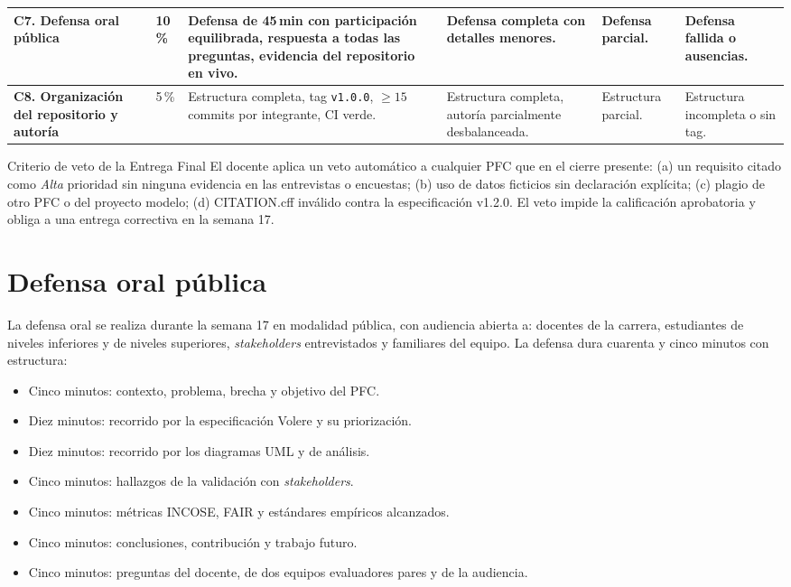 \documentclass[11pt,a4paper]{article}
\begin{document}
\begin{longtable}{|L{4.2cm}|C{0.9cm}|L{3.3cm}|L{2.4cm}|L{2.4cm}|L{1.6cm}|}
\textbf{C7. Defensa oral p\'ublica} & 10\,\% & Defensa de 45\,min con participaci\'on equilibrada, respuesta a todas las preguntas, evidencia del repositorio en vivo. & Defensa completa con detalles menores. & Defensa parcial. & Defensa fallida o ausencias.\\ \hline
\textbf{C8. Organizaci\'on del repositorio y autor\'ia} & 5\,\% & Estructura completa, tag \texttt{v1.0.0}, $\geq 15$ commits por integrante, CI verde. & Estructura completa, autor\'ia parcialmente desbalanceada. & Estructura parcial. & Estructura incompleta o sin tag.\\ \hline
\end{longtable}

\begin{cajacritica}{Criterio de veto de la Entrega Final}
El docente aplica un veto autom\'atico a cualquier PFC que en el cierre presente: (a) un requisito citado como \emph{Alta} prioridad sin ninguna evidencia en las entrevistas o encuestas; (b) uso de datos ficticios sin declaraci\'on expl\'icita; (c) plagio de otro PFC o del proyecto modelo; (d) CITATION.cff inv\'alido contra la especificaci\'on v1.2.0. El veto impide la calificaci\'on aprobatoria y obliga a una entrega correctiva en la semana 17.
\end{cajacritica}

\section{Defensa oral p\'ublica}

La defensa oral se realiza durante la semana 17 en modalidad p\'ublica, con audiencia abierta a: docentes de la carrera, estudiantes de niveles inferiores y de niveles superiores, \emph{stakeholders} entrevistados y familiares del equipo. La defensa dura cuarenta y cinco minutos con estructura:

\begin{itemize}
    \item Cinco minutos: contexto, problema, brecha y objetivo del PFC.
    \item Diez minutos: recorrido por la especificaci\'on Volere y su priorizaci\'on.
    \item Diez minutos: recorrido por los diagramas UML y de an\'alisis.
    \item Cinco minutos: hallazgos de la validaci\'on con \emph{stakeholders}.
    \item Cinco minutos: m\'etricas INCOSE, FAIR y est\'andares emp\'iricos alcanzados.
    \item Cinco minutos: conclusiones, contribuci\'on y trabajo futuro.
    \item Cinco minutos: preguntas del docente, de dos equipos evaluadores pares y de la audiencia.
\end{itemize}
\end{document}
